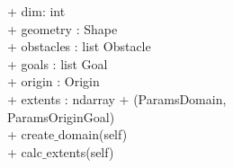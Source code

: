 {
+ dim: int \\
+ geometry : Shape \\
+ obstacles : list Obstacle\\
+ goals : list Goal\\
+ origin : Origin\\
+ extents : ndarray
}
{
+ \dunder(ParamsDomain, \\
   ParamsOriginGoal) \\
+ create$\_$domain(self)\\
+ calc$\_$extents(self)
}